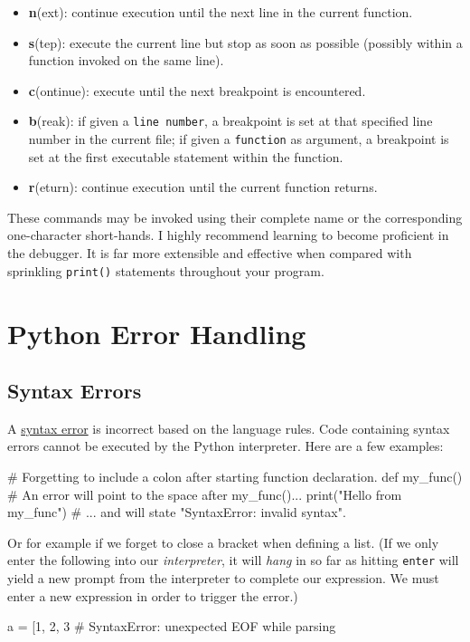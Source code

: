 \documentclass[12pt,letterpaper,twoside]{article}
\begin{document}
\begin{enumerate}
\begin{itemize}
  \item \textbf{n}(ext): continue execution until the next line in the current function.
  \item \textbf{s}(tep): execute the current line but stop as soon as possible (possibly within a function invoked on the same line).
  \item \textbf{c}(ontinue): execute until the next breakpoint is encountered.
  \item \textbf{b}(reak): if given a \texttt{line number}, a breakpoint is set at that specified line number in the current file; if given a \texttt{function} as argument, a breakpoint is set at the first executable statement within the function.
  \item \textbf{r}(eturn): continue execution until the current function returns.
\end{itemize} 

These commands may be invoked using their complete name or the corresponding one-character short-hands. I highly recommend learning to become proficient in the debugger. It is far more extensible and effective when compared with sprinkling \texttt{print()} statements throughout your program.



\section{Python Error Handling}

\subsection{Syntax Errors}

A \href{https://en.wikipedia.org/wiki/Syntax_error}{syntax error} 
is incorrect based on the language rules.
Code containing syntax errors cannot be executed by the Python interpreter.
Here are a few examples:

\begin{python}
# Forgetting to include a colon after starting function declaration.
def my_func()                   # An error will point to the space after my_func()...
  print("Hello from my_func")   # ... and will state "SyntaxError: invalid syntax".
\end{python}

Or for example if we forget to close a bracket when defining a list.
(If we only enter the following into our \emph{interpreter}, it will \emph{hang} in so far as hitting \texttt{enter} will yield a new prompt from the interpreter to complete our expression. We must enter a new expression in order to trigger the error.)
\begin{python}
a = [1, 2, 3            # SyntaxError: unexpected EOF while parsing
\end{python}


\end{enumerate}
\end{document}
